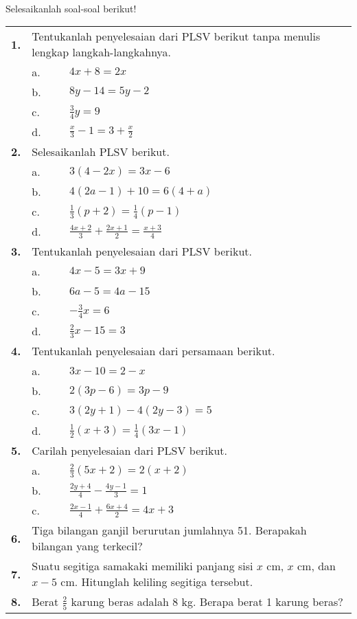 \documentclass[11pt,a4paper]{article}
\begin{document}
\begin{flushleft}

\\
Selesaikanlah soal-soal berikut!\\[0.8em]
\begingroup
\renewcommand{\arraystretch}{1.6} %
\begin{tabular}{p{0.3cm}p{0.3cm}p{16cm}} 
   \bf{1.}&\multicolumn{2}{p{16cm}}{Tentukanlah penyelesaian dari PLSV berikut tanpa menulis lengkap langkah-langkahnya.}\\
    &a.&$4x+8=2x$\\
    &b.&$8y-14=5y-2$\\
    &c.&$\frac{3}{4}y=9$\\
    &d.&$\frac{x}{3}-1=3+\frac{x}{2}$\\
   \bf{2.}&\multicolumn{2}{p{16cm}}{Selesaikanlah PLSV berikut.}\\
    &a.&$3(4-2x)=3x-6$\\
    &b.&$4(2a-1)+10=6(4+a)$\\
    &c.&$\frac{1}{3}(p+2)=\frac{1}{4}(p-1)$\\
    &d.&$\frac{4x+2}{3}+\frac{2x+1}{2}=\frac{x+3}{4}$\\
   \bf{3.}&\multicolumn{2}{p{16cm}}{Tentukanlah penyelesaian dari PLSV berikut.}\\
    &a.&$4x-5=3x+9$\\
    &b.&$6a-5=4a-15$\\
    &c.&$-\frac{3}{4}x=6$\\
    &d.&$\frac{2}{3}x-15=3$\\
   \bf{4.}&\multicolumn{2}{p{16cm}}{Tentukanlah penyelesaian dari persamaan berikut.}\\
    &a.&$3x-10=2-x$\\
    &b.&$2(3p-6)=3p-9$\\
    &c.&$3(2y+1)-4(2y-3)=5$\\
    &d.&$\frac{1}{2}(x+3)=\frac{1}{4}(3x-1)$\\
   \bf{5.}&\multicolumn{2}{p{16cm}}{Carilah penyelesaian dari PLSV berikut.}\\
    &a.&$\frac{2}{3}(5x+2)=2(x+2)$\\
    &b.&$\frac{2y+4}{4}-\frac{4y-1}{3}=1$\\
    &c.&$\frac{2x-1}{4}+\frac{6x+4}{2}=4x+3$\\
   \bf{6.}&\multicolumn{2}{p{16cm}}{Tiga bilangan ganjil berurutan jumlahnya 51. Berapakah bilangan yang terkecil?}\\
   \bf{7.}&\multicolumn{2}{p{16cm}}{Suatu segitiga samakaki memiliki panjang sisi $x$ cm, $x$ cm, dan $x-5$ cm. Hitunglah keliling segitiga tersebut.}\\
   \bf{8.}&\multicolumn{2}{p{16cm}}{Berat $\frac{2}{5}$ karung beras adalah 8 kg. Berapa berat 1 karung beras?}\\
\end{tabular}
\endgroup\\[0.7em]


\end{flushleft}
\end{document}
